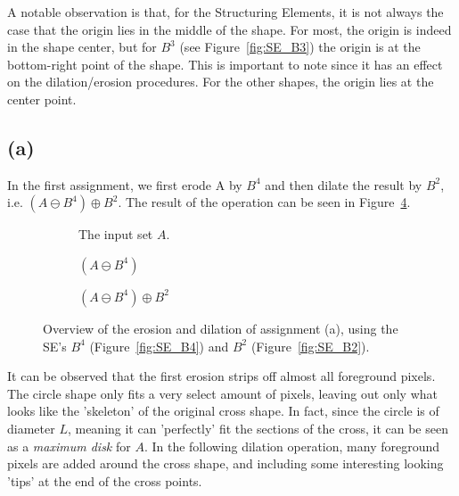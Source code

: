 \documentclass{article}
\begin{document}
A notable observation is that, for the Structuring Elements, it is not always the case that the origin lies in the middle of the shape. For most, the origin is indeed in the shape center, but for $B^3$ (see Figure~\ref{fig:SE_B3}) the origin is at the bottom-right point of the shape. This is important to note since it has an effect on the dilation/erosion procedures. For the other shapes, the origin lies at the center point.

\subsection*{(a)} In the first assignment, we first erode A by $B^4$ and then dilate the result by $B^2$, i.e. $(A \ominus B^4) \oplus B^2$. The result of the operation can be seen in Figure~\ref{fig:ex1_a}.

\begin{figure}[H]
     \centering
     \begin{subfigure}[b]{0.3\textwidth}
         \centering
         
         \caption{The input set $A$.}
         \label{fig:ex1_a-inputset}
     \end{subfigure}
     \hfill
     \begin{subfigure}[b]{0.3\textwidth}
         \centering
         
         \caption{$(A \ominus B^4)$}
         \label{fig:ex1_a-step1}
     \end{subfigure}
     \hfill
     \begin{subfigure}[b]{0.3\textwidth}
         \centering
         
         \caption{$(A \ominus B^4) \oplus B^2$}
         \label{fig:ex1_a-step2}
     \end{subfigure}
     
    \caption{Overview of the erosion and dilation of assignment (a), using the SE's $B^4$ (Figure~\ref{fig:SE_B4}) and $B^2$ (Figure~\ref{fig:SE_B2}).}
    \label{fig:ex1_a}
\end{figure}

It can be observed that the first erosion strips off almost all foreground pixels. The circle shape only fits a very select amount of pixels, leaving out only what looks like the 'skeleton' of the original cross shape. In fact, since the circle is of diameter $L$, meaning it can 'perfectly' fit the sections of the cross, it can be seen as a \textit{maximum disk} for $A$. In the following dilation operation, many foreground pixels are added around the cross shape, and including some interesting looking 'tips' at the end of the cross points.
\end{document}
